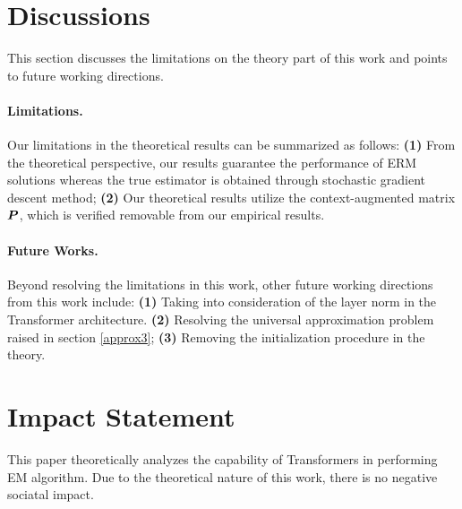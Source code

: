 \section{Discussions}\label{sect5}
This section discusses the limitations on the theory part of this work and points to future working directions. 
\paragraph{Limitations.} Our limitations in the theoretical results can be summarized as follows: \textbf{(1)} From the theoretical perspective, our results guarantee the performance of ERM solutions whereas the true estimator is obtained through stochastic gradient descent method; \textbf{(2)} Our theoretical results utilize the context-augmented matrix $\boldsymbol{P}$, which is verified removable from our empirical results. 
\paragraph{Future Works.} Beyond resolving the limitations in this work, other future working directions from this work include: \textbf{(1)} Taking into consideration of the layer norm in the Transformer architecture. \textbf{(2)} Resolving the universal approximation problem raised in section \ref{approx3}; \textbf{(3)} Removing the initialization procedure in the theory.




\section*{Impact Statement}
This paper theoretically analyzes the capability of Transformers in performing EM algorithm. Due to the theoretical nature of this work, there is no negative sociatal impact.
